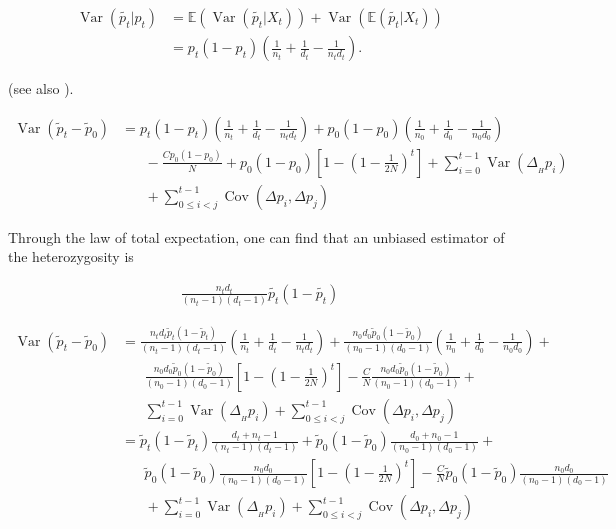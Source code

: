 \documentclass[11pt]{article}
\newcommand{\E}{\mathbb{E}}
\DeclareMathOperator{\var}{Var}
\DeclareMathOperator{\cov}{Cov}
\begin{document}
\begin{align}
  \var(\widetilde{p_t}|p_t) &= \E(\var(\widetilde{p_t} | X_t)) + \var(\E(\widetilde{p_t} | X_t)) \\
                            &= p_t(1-p_t) \left(\frac{1}{n_t} + \frac{1}{d_t} - \frac{1}{n_t d_t} \right).
\end{align}

(see also \cite{Jonas2016-ia}).

\begin{align}
  \var(\widetilde{p}_t - \widetilde{p}_0) &= 
  p_t(1-p_t) \left(\frac{1}{n_t} + \frac{1}{d_t} - \frac{1}{n_t d_t} \right)  
  + p_0(1-p_0) \left( \frac{1}{n_0} + \frac{1}{d_0} - \frac{1}{n_0 d_0}\right)  \\ & \;\;\;\;\;\;
  - \frac{C p_0(1-p_0)}{N} + p_0(1-p_0) \left[1 - \left(1-\frac{1}{2N}\right)^t \right]+ \sum_{i=0}^{t-1} \var(\Delta_{_H} p_i)  \\ & \;\;\;\;\;\; + \sum_{0 \le i < j}^{t-1} \cov(\Delta p_i, \Delta p_j) 
\end{align}

Through the law of total expectation, one can find that an unbiased estimator
of the heterozygosity is 

\begin{align}
  \frac{n_t d_t}{(n_t-1) (d_t-1)} \widetilde{p_t}(1-\widetilde{p_t})
\end{align}


\begin{align}
  \var(\widetilde{p}_t - \widetilde{p}_0) &= 
  \frac{n_t d_t \widetilde{p}_t(1-\widetilde{p}_t)}{(n_t-1)(d_t-1)} \left(\frac{1}{n_t} + \frac{1}{d_t} - \frac{1}{n_t d_t} \right) + 
 \frac{n_0 d_0 \widetilde{p}_0(1-\widetilde{p}_0)}{(n_0-1)(d_0-1)} \left( \frac{1}{n_0} + \frac{1}{d_0} - \frac{1}{n_0 d_0}\right) + \\ & \nonumber\;\;\;\;\;\;
 \frac{n_0 d_0 \widetilde{p}_0(1-\widetilde{p}_0)}{(n_0-1)(d_0-1)}   \left[1 - \left(1-\frac{1}{2N}\right)^t \right]  - \frac{C}{N}  \frac{n_0 d_0 \widetilde{p}_0(1-\widetilde{p}_0)}{(n_0-1)(d_0-1)} + \\ \nonumber & \;\;\;\;\;\; \sum_{i=0}^{t-1} \var(\Delta_{_H} p_i)  + \sum_{0 \le i < j}^{t-1} \cov(\Delta p_i, \Delta p_j)  \\
                                                                                                                      &= \widetilde{p}_t(1-\widetilde{p}_t)\frac{d_t + n_t - 1}{(n_t-1)(d_t-1)} + 
 \widetilde{p}_0(1-\widetilde{p}_0)\frac{d_0 + n_0 - 1}{(n_0-1)(d_0-1)} + \\ & \nonumber\;\;\;\;\;\;
 \widetilde{p}_0(1-\widetilde{p}_0) \frac{n_0 d_0}{(n_0-1)(d_0-1)}  \left[1 - \left(1-\frac{1}{2N}\right)^t \right] - \frac{C}{N} \widetilde{p}_0(1-\widetilde{p}_0)\frac{n_0 d_0}{(n_0-1)(d_0-1)} 
 \\ \nonumber & \;\;\;\;\;\; + \sum_{i=0}^{t-1} \var(\Delta_{_H} p_i)  + \sum_{0 \le i < j}^{t-1} \cov(\Delta p_i, \Delta p_j) \
\end{align}
\end{document}
